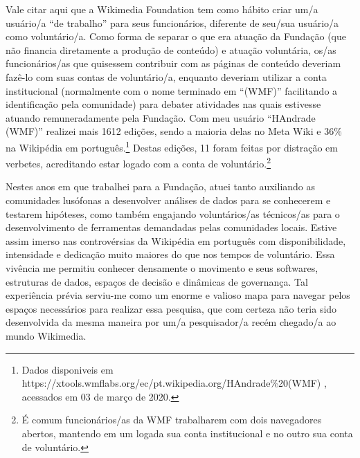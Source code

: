 Vale citar aqui que a Wikimedia Foundation tem como hábito criar um/a usuário/a “de trabalho” para seus funcionários, diferente de seu/sua usuário/a como voluntário/a. Como forma de separar o que era atuação da Fundação (que não financia diretamente a produção de conteúdo) e atuação voluntária, os/as funcionários/as que quisessem contribuir com as páginas de conteúdo deveriam fazê-lo com suas contas de voluntário/a, enquanto deveriam utilizar a conta institucional (normalmente com o nome terminado em “(WMF)” facilitando a identificação pela comunidade) para debater atividades nas quais estivesse atuando remuneradamente pela Fundação. Com meu usuário “HAndrade (WMF)” realizei mais 1612 edições, sendo a maioria delas no Meta Wiki e 36\% na Wikipédia em português.\footnote{Dados disponiveis em https://xtools.wmflabs.org/ec/pt.wikipedia.org/HAndrade\%20(WMF) , acessados em 03 de março de 2020.} Destas edições, 11 foram feitas por distração em verbetes, acreditando estar logado com a conta de voluntário.\footnote{É comum funcionários/as da WMF trabalharem com dois navegadores abertos, mantendo em um logada sua conta institucional e no outro sua conta de voluntário.}

Nestes anos em que trabalhei para a Fundação, atuei tanto auxiliando as comunidades lusófonas a desenvolver análises de dados para se conhecerem e testarem hipóteses, como também engajando voluntários/as técnicos/as para o desenvolvimento de ferramentas demandadas pelas comunidades locais. Estive assim imerso nas controvérsias da Wikipédia em português com disponibilidade, intensidade e dedicação muito maiores do que nos tempos de voluntário. Essa vivência me permitiu conhecer densamente o movimento e seus softwares, estruturas de dados, espaços de decisão e dinâmicas de governança. Tal experiência prévia serviu-me como um enorme e valioso mapa para navegar pelos espaços necessários para realizar essa pesquisa, que com certeza não teria sido desenvolvida da mesma maneira por um/a pesquisador/a recém chegado/a ao mundo Wikimedia.